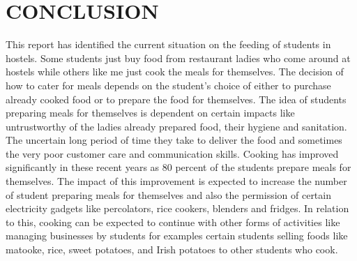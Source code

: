 \documentclass[14pt]{article}
\begin{document}
\section{CONCLUSION}
This report has identified the current situation on the feeding of students in hostels. Some students just buy food from restaurant ladies who come around at hostels while others like me just cook the meals for themselves.  The decision of how to cater for meals depends on the student’s choice of either to purchase already cooked food or to prepare the food for themselves. The idea of students preparing meals for themselves is dependent on certain impacts like untrustworthy of the ladies already prepared food, their hygiene and sanitation.  The uncertain long period of time they take to deliver the food and sometimes the very poor customer care and communication skills. Cooking has improved significantly in these recent years as 80 percent of the students prepare meals for themselves. The impact of this improvement is expected to increase the number of student preparing meals for themselves and also the permission of certain electricity gadgets like percolators, rice cookers, blenders and fridges. In relation to this, cooking can be expected to continue with other forms of activities like managing businesses by students for examples certain students selling foods like matooke, rice, sweet potatoes, and Irish potatoes to other students who cook.
\end{document}

